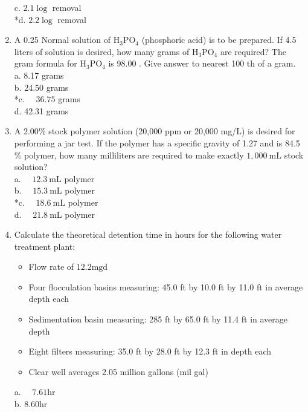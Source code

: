 \begin{enumerate}
c. $2.1 \log$ removal\\
*d. $2.2 \log$ removal\\
  \item A 0.25 Normal solution of $\mathrm{H}_{3} \mathrm{PO}_{4}$ (phosphoric acid) is to be prepared. If 4.5 liters of solution is desired, how many grams of $\mathrm{H}_{3} \mathrm{PO}_{4}$ are required? The gram formula for $\mathrm{H}_{3} \mathrm{PO}_{4}$ is 98.00 . Give answer to nearest 100 th of a gram.\\
a. 8.17 grams\\
b. 24.50 grams\\
*c. $\quad 36.75$ grams\\
d. 42.31 grams\\
  \item A $2.00 \%$ stock polymer solution (20,000 ppm or 20,000 mg/L) is desired for performing a jar test. If the polymer has a specific gravity of 1.27 and is 84.5 \% polymer, how many milliliters are required to make exactly $1,000 \mathrm{~mL}$ stock solution?\\
a. $\quad 12.3 \mathrm{~mL}$ polymer\\
b. $\quad 15.3 \mathrm{~mL}$ polymer\\
*c. $\quad 18.6 \mathrm{~mL}$ polymer\\
d. $\quad 21.8 \mathrm{~mL}$ polymer \\
\item Calculate the theoretical detention time in hours for the following water treatment plant:\\
\begin{itemize}
  \item Flow rate of $12.2 \mathrm{mgd}$\\
  \item Four flocculation basins measuring: 45.0 ft by 10.0 ft by 11.0 ft in average depth each\\
  \item Sedimentation basin measuring: 285 ft by 65.0 ft by 11.4 ft in average depth\\
  \item Eight filters measuring: 35.0 ft by 28.0 ft by 12.3 ft in depth each\\
  \item Clear well averages 2.05 million gallons (mil gal)\\
\end{itemize}
a. $\quad 7.61 \mathrm{hr}$\\
b. $8.60 \mathrm{hr}$\\

\end{enumerate}
